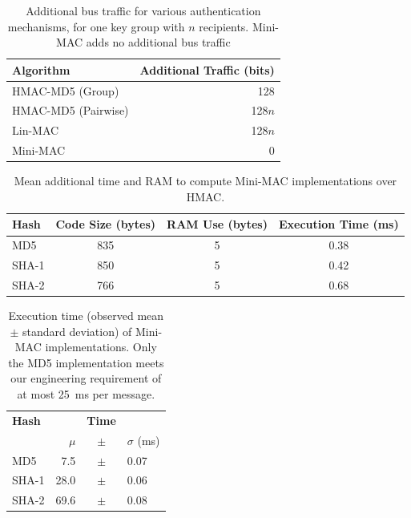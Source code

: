 	
	\begin{table}
	\centering
	\caption{Additional bus traffic for various authentication mechanisms, 
	for one key group with $n$ recipients.  Mini-MAC adds no additional bus traffic}
	\label{tab-traffic}
	\vspace{8pt}
	\begin{tabular}{l|r}%
	\bfseries Algorithm & \bfseries Additional Traffic (bits) \\\hline 
	HMAC-MD5 (Group) & 128 \\
	HMAC-MD5 (Pairwise) & 128$n$ \\
	Lin-MAC & 128$n$ \\
	Mini-MAC & 0 \\
	\end{tabular}
	\end{table}

	\begin{table}	
	\centering	
	\caption{Mean additional time and RAM to compute Mini-MAC implementations over HMAC.}
	\label{tab-overhead}
	\vspace{8pt}
	\begin{tabular}{l|c|c|c}%
	\bfseries Hash & \bfseries Code Size (bytes) & \bfseries RAM Use (bytes) & \bfseries Execution Time (ms)\\\hline 
	MD5 & 835 & 5 & 0.38 \\
	SHA-1 & 850 & 5 & 0.42 \\
	SHA-2 & 766 & 5 & 0.68 \\
	\end{tabular}
	\end{table}
	
	\begin{table}
	\centering
	\caption{Execution time (observed mean $\pm$ standard deviation) of Mini-MAC implementations.
	Only the MD5 implementation meets our engineering requirement of at most 25~ms per message.}
	\label{tab-time}
	\vspace{8pt}
	\begin{tabular}{ @{}l | rcl}
	\hspace{2pt}\textbf{Hash} && {\textbf{Time}}&\\
		& $\mu$ & $\pm$ & $\sigma$ (ms)  \\
		\hline 
		\hspace{2pt}MD5 	& 7.5 		& $\pm$ 	& 0.07 \\
		\hspace{2pt}SHA-1 	& 28.0 		& $\pm$		& 0.06 \\
		\hspace{2pt}SHA-2 	& 69.6 		& $\pm$		& 0.08 \\ 
	\end{tabular}	
	\end{table}
	
